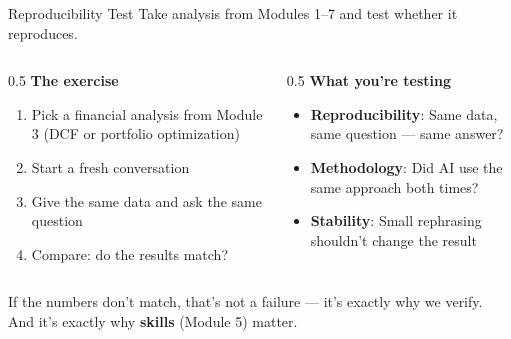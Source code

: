 \documentclass[aspectratio=169]{beamer}
\begin{document}
\begin{frame}{Reproducibility Test}
Take analysis from Modules 1--7 and test whether it reproduces.
\vspace{0.3cm}
\begin{columns}[T]
\begin{column}{0.5\textwidth}
\textbf{The exercise}
\begin{enumerate}\small
  \item Pick a financial analysis from Module 3 (DCF or portfolio optimization)
  \item Start a \alert{fresh conversation}
  \item Give the same data and ask the same question
  \item Compare: do the results match?
\end{enumerate}
\end{column}
\begin{column}{0.5\textwidth}
\textbf{What you're testing}
\begin{itemize}\small
  \item \textbf{Reproducibility}: Same data, same question --- same answer?
  \item \textbf{Methodology}: Did AI use the same approach both times?
  \item \textbf{Stability}: Small rephrasing shouldn't change the result
\end{itemize}
\end{column}
\end{columns}
\vspace{0.3cm}
If the numbers don't match, that's not a failure --- it's \alert{exactly why we verify}. And it's exactly why \textbf{skills} (Module 5) matter.
\end{frame}
\end{document}
